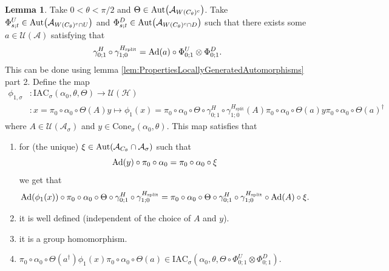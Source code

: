 \documentclass[12pt,a4paper,twoside]{article}
\newcommand{\IAC}{\textrm{IAC}}
\let\originalleft\left
\let\originalright\right
\renewcommand{\left}{\mathopen{}\mathclose\bgroup\originalleft}
\renewcommand{\right}{\aftergroup\egroup\originalright}
\newcommand{\UU}{\mathcal U}
\newcommand{\HH}{\mathcal H}
\renewcommand{\AA}{\mathcal A}
\newcommand{\Ad}[1]{\textrm{Ad}\left(#1\right)}
\newcommand{\Aut}[1]{\textrm{Aut}\left(#1\right)}
\theoremstyle{definition}
\newtheorem{lemma}[theorem]{Lemma}
\numberwithin{equation}{section}
\begin{document}
\begin{lemma}\label{lem:DefinitionOfGroupMorphism}
	Take $0<\theta<\pi/2$ and $\Theta\in \Aut{\AA_{W(C_\theta)^c}}$. Take $\Phi^U_{s;t}\in\Aut{\AA_{W(C_\theta)^c\cap U}}$ and $\Phi^D_{s;t}\in\Aut{\AA_{W(C_\theta)^c\cap D}}$ such that there exists some $a\in\UU(\AA)$ satisfying that
	\begin{equation}\label{eq:DefinitionOfGroupMorphismHAutEquation}
		\gamma^H_{0;1}\circ\gamma^{H_\text{split}}_{1;0}=\Ad{a}\circ \Phi^U_{0;1}\otimes\Phi^D_{0;1}.
	\end{equation}
	This can be done using lemma \ref{lem:PropertiesLocallyGeneratedAutomorphisms} part 2. Define the map
	\begin{align}
		\phi_{1,\sigma}&:\IAC_\sigma(\alpha_0,\theta,\Theta) \rightarrow \UU(\HH)\\
		\nonumber
		&:x=\pi_0\circ\alpha_0\circ\Theta(A)y\mapsto \phi_1(x)=\pi_0\circ\alpha_0\circ\Theta\circ\gamma^H_{0;1}\circ\gamma^{H_\text{split}}_{1;0}(A)\pi_0\circ\alpha_0\circ\Theta(a)y\pi_0\circ\alpha_0\circ\Theta(a)^\dagger
	\end{align}
	where $A\in\UU(\AA_\sigma)$ and $y\in\textrm{Cone}_\sigma(\alpha_0,\theta)$. This map satisfies that
	\begin{enumerate}
		\item  for (the unique) $\xi\in\Aut{\AA_{C_\theta}\cap\AA_\sigma}$ such that
		\begin{equation}
			\Ad{y}\circ\pi_0\circ\alpha_0=\pi_0\circ\alpha_0\circ\xi
		\end{equation}
		we get that
		\begin{equation}\label{eq:ConditionDefinitionOfGroupMorphism}
			\Ad{\phi_1(x)}\circ\pi_0\circ\alpha_0\circ\Theta\circ\gamma^H_{0;1}\circ\gamma^{H_\text{split}}_{1;0}=\pi_0\circ\alpha_0\circ\Theta\circ\gamma^H_{0;1}\circ\gamma^{H_\text{split}}_{1;0}\circ\Ad{A}\circ\xi.
		\end{equation}
		\item it is well defined (independent of the choice of $A$ and $y$).
		\item it is a group homomorphism.
		\item $\pi_0\circ\alpha_0\circ\Theta(a^\dagger)\phi_1(x)\pi_0\circ\alpha_0\circ\Theta(a)\in\IAC_\sigma(\alpha_0,\theta,\Theta\circ \Phi^U_{0;1}\otimes\Phi^D_{0;1})$.
	\end{enumerate}
\end{lemma}
\end{document}
